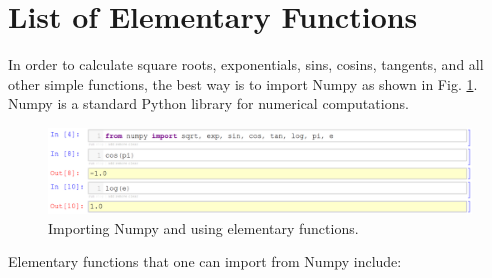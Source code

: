 \documentclass[article,A4,12pt]{llncs}
\begin{document}
\section{List of Elementary Functions}

In order to calculate square roots, exponentials, sins, cosins, tangents, and all other 
simple functions, the best way is to import Numpy as shown in Fig. \ref{fig:fns}. Numpy 
is a standard Python library for numerical computations.

\begin{figure}[!ht]
\begin{center}
\includegraphics[width=\textwidth]{img/fns.png}
\end{center}
\vspace{-4mm}
\caption{Importing Numpy and using elementary functions.}
\label{fig:fns}
\end{figure}

\newpage
\noindent
Elementary functions that one can import from Numpy include:\\
\end{document}
